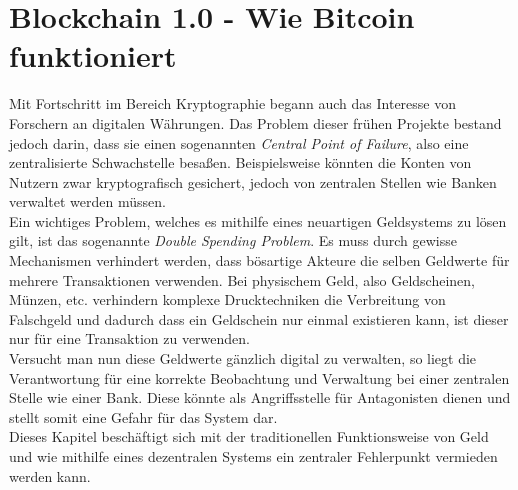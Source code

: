 \chapter{Blockchain 1.0 - Wie Bitcoin funktioniert}
Mit Fortschritt im Bereich Kryptographie begann auch das Interesse von Forschern an digitalen Währungen. 
Das Problem dieser frühen Projekte bestand jedoch darin, dass sie einen sogenannten \emph{Central Point of Failure}, also eine zentralisierte Schwachstelle besaßen. 
Beispielsweise könnten die Konten von Nutzern zwar kryptografisch gesichert, jedoch von zentralen Stellen wie Banken verwaltet werden müssen.\\
Ein wichtiges Problem, welches es mithilfe eines neuartigen Geldsystems zu lösen gilt, ist das sogenannte \emph{Double Spending Problem}. Es muss durch gewisse Mechanismen verhindert werden, dass bösartige Akteure die selben Geldwerte für mehrere Transaktionen verwenden. Bei physischem Geld, also Geldscheinen, Münzen, etc. verhindern komplexe Drucktechniken die Verbreitung von Falschgeld und dadurch dass ein Geldschein nur einmal existieren kann, ist dieser nur für eine Transaktion zu verwenden.\\
Versucht man nun diese Geldwerte gänzlich digital zu verwalten, so liegt die Verantwortung für eine korrekte Beobachtung und Verwaltung bei einer zentralen Stelle wie einer Bank. Diese könnte als Angriffsstelle für Antagonisten dienen und stellt somit eine Gefahr für das System dar.\\
Dieses Kapitel beschäftigt sich mit der traditionellen Funktionsweise von Geld und wie mithilfe eines dezentralen Systems ein zentraler Fehlerpunkt vermieden werden kann. 
